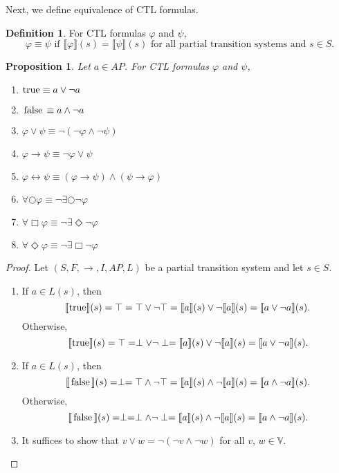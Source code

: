 \documentclass[12pt]{article}
\newcommand{\always}{\Box}
\newcommand{\eventually}{\Diamond}
\newcommand{\nxt}{\bigcirc}
\newcommand{\TRUE}{\mbox{\lstinline{true}}}
\newcommand{\FALSE}{\mbox{\lstinline{false}}}
\newtheorem{proposition}{Proposition}
\theoremstyle{definition}
\newtheorem{definition}{Definition}
\newcommand{\satisfaction}[1]{\llbracket #1 \rrbracket}
\newenvironment{franck}{\color{red}}{\color{black}}
\begin{document}
Next, we define equivalence of CTL formulas.

\begin{definition}
For CTL formulas $\varphi$ and $\psi$, 
\[
\varphi \equiv \psi \mbox{ if } \satisfaction{\varphi}(s) = \satisfaction{\psi}(s) \mbox{ for all partial transition systems and } s \in S.
\]
\end{definition}

\begin{franck}
\begin{proposition}
Let $a \in \mathit{AP}$.  For CTL formulas $\varphi$ and $\psi$, 
\begin{enumerate}
\item 
$\TRUE \equiv a \vee \neg a$
\item 
$\FALSE \equiv a \wedge \neg a$
\item
$\varphi \vee \psi \equiv \neg(\neg \varphi \wedge \neg \psi)$
\item
$\varphi \rightarrow \psi \equiv \neg \varphi \vee \psi$
\item
$\varphi \leftrightarrow \psi \equiv (\varphi \rightarrow \psi) \wedge (\psi \rightarrow \varphi)$
\item
$\forall \nxt \varphi \equiv \neg \exists \nxt \neg \varphi$
\item
$\forall \always \varphi \equiv \neg \exists \eventually \neg \varphi$
\item
$\forall \eventually \varphi \equiv \neg \exists \always \neg \varphi$
\end{enumerate}
\end{proposition}
\begin{proof}
Let $(S, F, \rightarrow, I, \mathit{AP}, L)$ be a partial transition system and let $s \in S$.
\begin{enumerate}
\item 
If $a \in L(s)$, then
\[
\satisfaction{\TRUE}(s) = \top = \top \vee \neg \top = \satisfaction{a}(s) \vee \neg \satisfaction{a}(s) = \satisfaction{a \vee \neg a}(s).
\]
Otherwise,
\[
\satisfaction{\TRUE}(s) = \top = \perp \vee \neg \perp = \satisfaction{a}(s) \vee \neg \satisfaction{a}(s) = \satisfaction{a \vee \neg a}(s).
\]
\item
If $a \in L(s)$, then
\[
\satisfaction{\FALSE}(s) = \perp = \top \wedge \neg \top = \satisfaction{a}(s) \wedge \neg \satisfaction{a}(s) = \satisfaction{a \wedge \neg a}(s).
\]
Otherwise,
\[
\satisfaction{\FALSE}(s) = \perp = \perp \wedge \neg \perp = \satisfaction{a}(s) \wedge \neg \satisfaction{a}(s) = \satisfaction{a \wedge \neg a}(s).
\]
\item
It suffices to show that $v \vee w = \neg(\neg v \wedge \neg w)$ for all $v$, $w \in \mathbb{V}$.


\end{enumerate}
\end{proof}
\end{franck}
\end{document}
